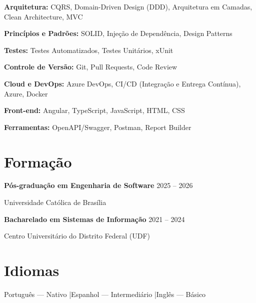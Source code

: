 \documentclass[11pt,a4paper]{article}
\begin{document}
\vspace{0.3cm}

\textbf{Arquitetura:} CQRS, Domain-Driven Design (DDD), Arquitetura em Camadas, Clean Architecture, MVC

\vspace{0.3cm}

\textbf{Princípios e Padrões:} SOLID, Injeção de Dependência, Design Patterns

\vspace{0.3cm}

\textbf{Testes:} Testes Automatizados, Testes Unitários, xUnit

\vspace{0.3cm}

\textbf{Controle de Versão:} Git, Pull Requests, Code Review

\vspace{0.3cm}

\textbf{Cloud e DevOps:} Azure DevOps, CI/CD (Integração e Entrega Contínua), Azure, Docker

\vspace{0.3cm}

\textbf{Front-end:} Angular, TypeScript, JavaScript, HTML, CSS

\vspace{0.3cm}

\textbf{Ferramentas:} OpenAPI/Swagger, Postman, Report Builder

\section{Formação}

\textbf{Pós-graduação em Engenharia de Software}
\hfill 2025 -- 2026

Universidade Católica de Brasília

\vspace{0.4cm}

\textbf{Bacharelado em Sistemas de Informação}
\hfill 2021 -- 2024

Centro Universitário do Distrito Federal (UDF)

\section{Idiomas}

Português — Nativo \quad|\quad Espanhol — Intermediário \quad|\quad Inglês — Básico
\end{document}
